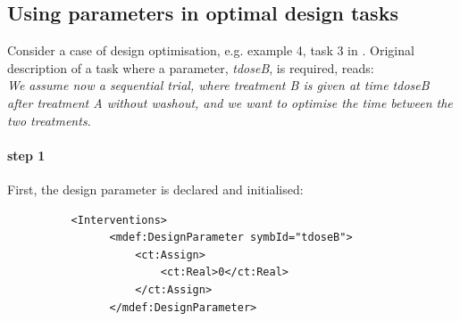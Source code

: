 \subsection{Using parameters in optimal design tasks} 
\label{subsec:paramsInDesign}
Consider a case of design optimisation, e.g. example 4, task 3 in 
\cite{CommetsExamples2015}. Original description of a task where 
a parameter, \emph{tdoseB}, is required, reads: \\
\emph{We assume now a sequential trial, where treatment B is given 
at time tdoseB after treatment A without washout, and we want to 
optimise the time between the two treatments.} 

\paragraph{step 1} First, the design parameter is declared and initialised: 
\lstset{language=XML}
\begin{lstlisting}
          <Interventions>
                <mdef:DesignParameter symbId="tdoseB">
                    <ct:Assign>
                        <ct:Real>0</ct:Real>
                    </ct:Assign>
                </mdef:DesignParameter>
\end{lstlisting}
